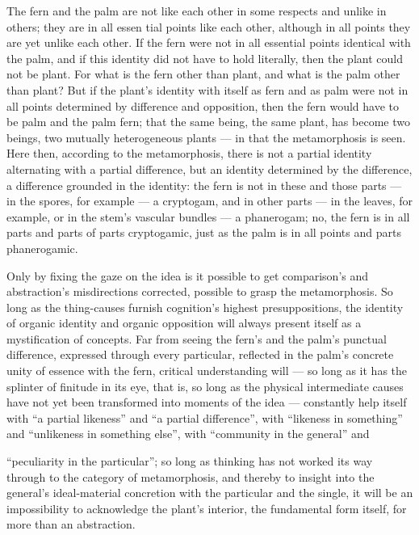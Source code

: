 \documentclass[12pt,a4paper]{book}
\begin{document}
The fern and the palm are not like each other in some respects and unlike in
others; they are in all essen%
tial points like each other, although in all points they are yet unlike each other.
If the fern were not in all essential points identical with the palm, and if this
identity did not have to hold literally, then the plant could not be plant. For
what is the fern other than plant, and what is the palm other than plant? But if
the plant's identity with itself as fern and as palm were not in all points
determined by difference and opposition, then the fern would have to be palm and
the palm fern; that the same being, the same plant, has become two beings, two
mutually heterogeneous plants --- in that the metamorphosis is seen. Here then,
according to the metamorphosis, there is not a partial identity alternating with a
partial difference, but an identity determined by the difference, a difference
grounded in the identity: the fern is not in these and those parts --- in the
spores, for example --- a cryptogam, and in other parts --- in the leaves, for
example, or in the stem's vascular bundles --- a phanerogam; no, the fern is in all
parts and parts of parts cryptogamic, just as the palm is in all points and parts
phanerogamic.

Only by fixing the gaze on the idea is it possible to get comparison's and
abstraction's misdirections corrected, possible to grasp the metamorphosis. So
long as the thing-causes furnish cognition's highest presuppositions, the identity
of organic identity and organic opposition will always present itself as a
mystification of concepts. Far from seeing the fern's and the palm's punctual
difference, expressed through every particular, reflected in the palm's concrete
unity of essence with the fern, critical understanding will --- so long as it has
the splinter of finitude in its eye, that is, so long as the physical intermediate
causes have not yet been transformed into moments of the idea --- constantly help
itself with ``a partial likeness'' and ``a partial difference'', with ``likeness in
something'' and ``unlikeness in something else'', with ``community in the general''
and

``peculiarity in the particular''; so long as thinking has not worked its way
through to the category of metamorphosis, and thereby to insight into the general's
ideal-material concretion with the particular and the single, it will be an
impossibility to acknowledge the plant's interior, the fundamental form itself, for
more than an abstraction.
\end{document}
